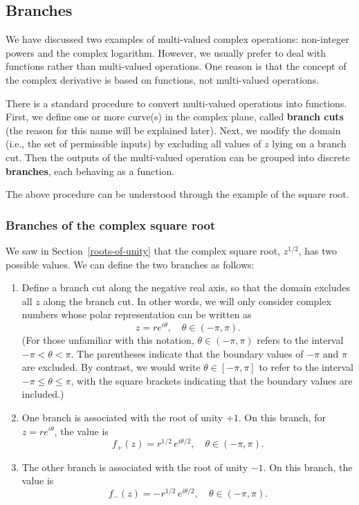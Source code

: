 \documentclass[10pt,a4paper]{article}
\begin{document}
\subsection{Branches}\label{branches}

We have discussed two examples of multi-valued complex operations:
non-integer powers and the complex logarithm. However, we usually
prefer to deal with functions rather than multi-valued operations. One
reason is that the concept of the complex derivative is based on
functions, not multi-valued operations.

There is a standard procedure to convert multi-valued operations into
functions. First, we define one or more curve(s) in the complex plane,
called \textbf{branch cuts} (the reason for this name will be
explained later).  Next, we modify the domain (i.e., the set of
permissible inputs) by excluding all values of $z$ lying on a branch
cut. Then the outputs of the multi-valued operation can be grouped
into discrete \textbf{branches}, each behaving as a function.

The above procedure can be understood through the example of the
square root.

\subsubsection{Branches of the complex square root}
\label{branches-of-the-complex-square-root}

We saw in Section~\ref{roots-of-unity} that the complex square root,
$z^{1/2}$, has two possible values. We can define the two branches as
follows:

\begin{enumerate}
\item Define a branch cut along the negative real axis, so that the
  domain excludes all $z$ along the branch cut. In other words, we
  will only consider complex numbers whose polar representation can be
  written as $$z = r e^{i\theta}, \quad \theta \in (-\pi, \pi).$$ (For
  those unfamiliar with this notation, $\theta \in (-\pi, \pi)$ refers
  to the interval $-\pi < \theta < \pi$.  The parentheses indicate
  that the boundary values of $-\pi$ and $\pi$ are excluded.  By
  contrast, we would write $\theta \in [-\pi, \pi]$ to refer to the
  interval $-\pi \le \theta \le \pi$, with the square brackets
  indicating that the boundary values are included.)

\item One branch is associated with the root of unity $+1$. On this
  branch, for $z = re^{i\theta}$, the value is $$f_+(z) = r^{1/2} \,
  e^{i\theta/2}, \quad \theta \in (-\pi, \pi).$$

\item The other branch is associated with the root of unity $-1$. On
  this branch, the value is $$f_-(z) = -r^{1/2} \, e^{i\theta/2},
  \quad \theta \in (-\pi, \pi).$$
\end{enumerate}
\end{document}

